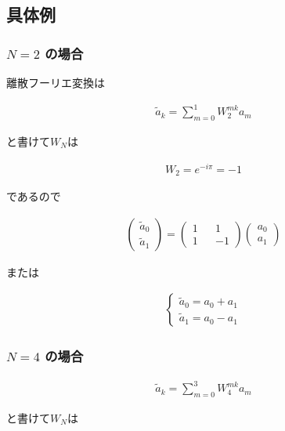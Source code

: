 \subsection{具体例}

\subsubsection{$N = 2$ の場合}

離散フーリエ変換は

\begin{align}
    \tilde{a}_k = \sum_{m = 0}^{1} W_2^{mk} a_m
\end{align}

と書けて$W_N$は

\begin{align*}
    W_2 = e^{-i\pi} = -1
\end{align*}

であるので

\begin{align}
    \begin{pmatrix}
        \tilde{a}_0\\
        \tilde{a}_1
    \end{pmatrix}
    =
    \begin{pmatrix}
        1 && 1 \\
        1 && -1
    \end{pmatrix}
    \begin{pmatrix}
        a_0\\
        a_1
    \end{pmatrix}
\end{align}

または

\begin{align}
    \begin{cases}
        \tilde{a}_0 = a_0 + a_1\\
        \tilde{a}_1 = a_0 - a_1
    \end{cases}
\end{align}

\subsubsection{$N = 4$ の場合}

\begin{align}
    \tilde{a}_k = \sum_{m = 0}^{3} W_4^{mk} a_m
\end{align}

と書けて$W_N$は

